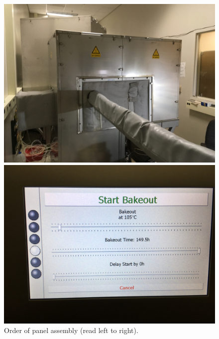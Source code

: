 \begin{enumerate}
\begin{figure}[H]
\begin{minipage}[c]{0.33\linewidth}
	\end{minipage}\hfill
	\begin{minipage}[c]{0.33\linewidth}
		\centering
		\includegraphics[width=1\textwidth]{panels8.jpg}
	\end{minipage}\hfill
	\begin{minipage}[c]{0.33\linewidth}
		\centering
		\includegraphics[width=1\textwidth]{panels9.jpg}
	\end{minipage}\hfill
	\caption{Order of panel assembly (read left to right).}
	\label{fig:gradual_heating}
\end{figure}





\end{enumerate}
